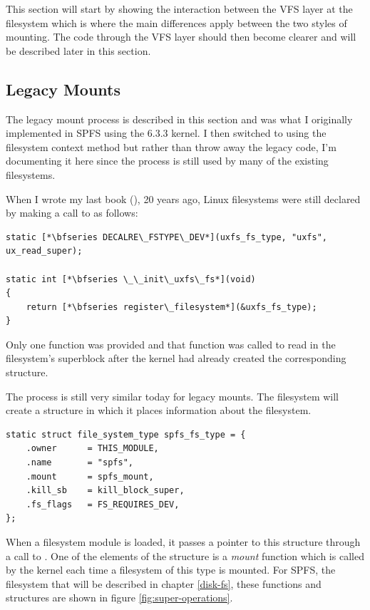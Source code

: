 This section will start by showing the interaction between the VFS layer at the filesystem which is where the main differences apply between the two styles of mounting. The code through the VFS layer should then become clearer and will be described later in this section.


\subsection{Legacy Mounts}

The legacy mount process is described in this section and was what I originally implemented in SPFS using the 6.3.3 kernel. I then switched to using the filesystem context method but rather than throw away the legacy code, I'm documenting it here since the process is still used by many of the existing filesystems.

When I wrote my last book (\cite{pate-filesystems}), 20 years ago, Linux filesystems were still declared by making a call to  as follows:

\begin{lstlisting}
static [*\bfseries DECALRE\_FSTYPE\_DEV*](uxfs_fs_type, "uxfs", ux_read_super);

static int [*\bfseries \_\_init\_uxfs\_fs*](void)
{
    return [*\bfseries register\_filesystem*](&uxfs_fs_type);
}
\end{lstlisting}

\noindent
Only one function was provided and that function was called to read in the filesystem's superblock after the kernel had already created the corresponding  structure.

The process is still very similar today for legacy mounts. The filesystem will create a  structure in which it places information about the filesystem. 

\begin{lstlisting}
static struct file_system_type spfs_fs_type = {
    .owner      = THIS_MODULE,
    .name       = "spfs",   
    .mount      = spfs_mount,
    .kill_sb    = kill_block_super,
    .fs_flags   = FS_REQUIRES_DEV,
};  
\end{lstlisting}

\noindent
When a filesystem module is loaded, it passes a pointer to this structure through a call to . One of the elements of the structure is a \textit{mount} function which is called by the kernel each time a filesystem of this type is mounted. For SPFS, the filesystem that will be described in chapter \ref{disk-fs}, these functions and structures are shown in figure \ref{fig:super-operations}.

